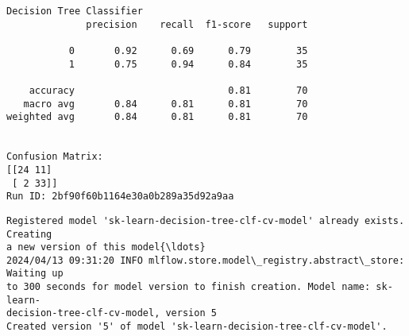 \documentclass[11pt]{article}
\begin{document}
    \begin{Verbatim}[commandchars=\\\{\}]
Decision Tree Classifier
              precision    recall  f1-score   support

           0       0.92      0.69      0.79        35
           1       0.75      0.94      0.84        35

    accuracy                           0.81        70
   macro avg       0.84      0.81      0.81        70
weighted avg       0.84      0.81      0.81        70


Confusion Matrix:
[[24 11]
 [ 2 33]]
Run ID: 2bf90f60b1164e30a0b289a35d92a9aa
    \end{Verbatim}

    \begin{Verbatim}[commandchars=\\\{\}]
Registered model 'sk-learn-decision-tree-clf-cv-model' already exists. Creating
a new version of this model{\ldots}
2024/04/13 09:31:20 INFO mlflow.store.model\_registry.abstract\_store: Waiting up
to 300 seconds for model version to finish creation. Model name: sk-learn-
decision-tree-clf-cv-model, version 5
Created version '5' of model 'sk-learn-decision-tree-clf-cv-model'.
    \end{Verbatim}
\end{document}
